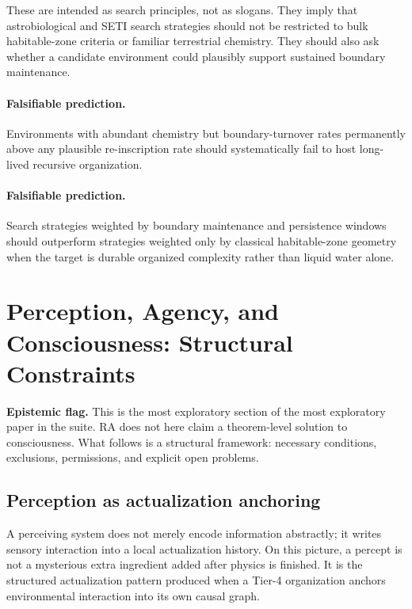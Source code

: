 \documentclass[11pt]{article}
\begin{document}
These are intended as search principles, not as slogans. They imply that astrobiological and SETI search strategies should not be restricted to bulk habitable-zone criteria or familiar terrestrial chemistry. They should also ask whether a candidate environment could plausibly support sustained boundary maintenance.

\paragraph{Falsifiable prediction.} Environments with abundant chemistry but boundary-turnover rates permanently above any plausible re-inscription rate should systematically fail to host long-lived recursive organization.

\paragraph{Falsifiable prediction.} Search strategies weighted by boundary maintenance and persistence windows should outperform strategies weighted only by classical habitable-zone geometry when the target is durable organized complexity rather than liquid water alone.

\section{Perception, Agency, and Consciousness: Structural Constraints}
\label{sec:consciousness}

\textbf{Epistemic flag.} This is the most exploratory section of the most exploratory paper in the suite. RA does not here claim a theorem-level solution to consciousness. What follows is a structural framework: necessary conditions, exclusions, permissions, and explicit open problems.

\subsection{Perception as actualization anchoring}

A perceiving system does not merely encode information abstractly; it writes sensory interaction into a local actualization history. On this picture, a percept is not a mysterious extra ingredient added after physics is finished. It is the structured actualization pattern produced when a Tier-4 organization anchors environmental interaction into its own causal graph.
\end{document}
